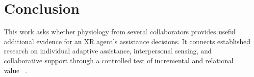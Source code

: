 \section{Conclusion}
\label{sec:11}

This work asks whether physiology from several collaborators provides useful additional evidence for an XR agent's assistance decisions. It connects established research on individual adaptive assistance, interpersonal sensing, and collaborative support through a controlled test of incremental and relational value ~\cite{guide,sensing,p52,p34}.

